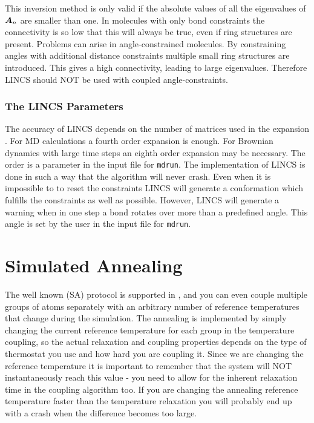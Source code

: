 This inversion method is only valid if the absolute values of all the
eigenvalues of $\mbox{\boldmath ${A}$}_n$ are smaller than one.
In molecules with only bond constraints the connectivity is so low
that this will always be true, even if ring structures are present.
Problems can arise in angle-constrained molecules.
By constraining angles with additional distance constraints
multiple small ring structures are introduced.
This gives a high connectivity, leading to large eigenvalues.
Therefore LINCS should NOT be used with coupled angle-constraints.

\subsubsection{The LINCS Parameters}
The accuracy of LINCS depends on the number of matrices used
in the expansion . For MD calculations a fourth order
expansion is enough. For Brownian dynamics with
large time steps an eighth order expansion may be necessary.
The order is a parameter in the input file for \verb'mdrun'.
The implementation of LINCS is done in such a way that the 
algorithm will never crash. Even when it is impossible to
to reset the constraints LINCS will generate a conformation
which fulfills the constraints as well as possible.
However, LINCS will generate a warning when in one step a bond 
rotates over more than a predefined angle.
This angle is set by the user in the input file for \verb'mdrun'.


\section{Simulated Annealing}
\label{sec:SA}
The well known 
(SA) protocol is supported in {\gromacs}, and you can even couple multiple
groups of atoms separately with an arbitrary number of reference temperatures
that change during the simulation. The annealing is implemented by simply 
changing the current reference temperature for each group in the temperature
coupling, so the actual relaxation and coupling properties depends on the
type of thermostat you use and how hard you are coupling it. Since we are
changing the reference temperature it is important to remember that the system
will NOT instantaneously reach this value - you need to allow for the inherent
relaxation time in the coupling algorithm too. If you are changing the 
annealing reference temperature faster than the temperature relaxation you
will probably end up with a crash when the difference becomes too large.

